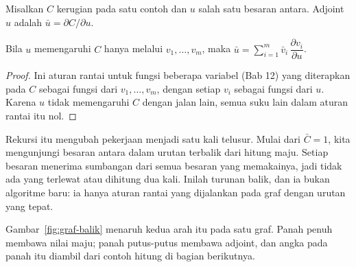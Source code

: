 
\begin{definisi}[Adjoint]
Misalkan $C$ kerugian pada satu contoh dan $u$ salah satu besaran antara. Adjoint $u$
adalah $\bar{u}=\partial C/\partial u$.
\end{definisi}

\begin{proposisi}
Bila $u$ memengaruhi $C$ hanya melalui $v_{1},\dots,v_{m}$, maka
$\bar{u}=\sum_{i=1}^{m}\bar{v}_{i}\,\dfrac{\partial v_{i}}{\partial u}$.
\end{proposisi}

\begin{proof}
Ini aturan rantai untuk fungsi beberapa variabel (Bab 12) yang diterapkan pada $C$ sebagai
fungsi dari $v_{1},\dots,v_{m}$, dengan setiap $v_{i}$ sebagai fungsi dari $u$. Karena $u$
tidak memengaruhi $C$ dengan jalan lain, semua suku lain dalam aturan rantai itu nol.
\end{proof}

Rekursi itu mengubah pekerjaan menjadi satu kali telusur. Mulai dari $\bar{C}=1$, kita
mengunjungi besaran antara dalam urutan terbalik dari hitung maju. Setiap besaran menerima
sumbangan dari semua besaran yang memakainya, jadi tidak ada yang terlewat atau dihitung dua kali. Inilah turunan balik, dan ia bukan algoritme baru: ia hanya aturan rantai
yang dijalankan pada graf dengan urutan yang tepat.

Gambar~\ref{fig:graf-balik} menaruh kedua arah itu pada satu graf. Panah penuh membawa
nilai maju; panah putus-putus membawa adjoint, dan angka pada panah itu diambil dari
contoh hitung di bagian berikutnya.


